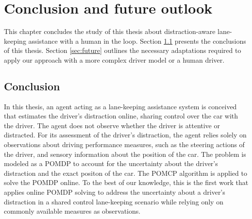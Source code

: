 \chapter{Conclusion and future outlook}
\label{ch:conclusion}

This chapter concludes the study of this thesis about distraction-aware lane-keeping assistance with a human in the loop. Section \ref{sec:conclusion} presents the conclusions of this thesis. Section \ref{sec:future} outlines the necessary adaptations required to apply our approach with a more complex driver model or a human driver.

\section{Conclusion}
\label{sec:conclusion}

In this thesis, an agent acting as a lane-keeping assistance system is conceived that estimates the driver's distraction online, sharing control over the car with the driver. The agent does not observe whether the driver is attentive or distracted. For its assessment of the driver's distraction, the agent relies solely on observations about driving performance measures, such as the steering actions of the driver, and sensory information about the position of the car. The problem is modeled as a POMDP to account for the uncertainty about the driver's distraction and the exact positon of the car. The POMCP algorithm \parencite{pomcp} is applied to solve the POMDP online. To the best of our knowledge, this is the first work that applies online POMDP solving to address the uncertainty about a driver's distraction in a shared control lane-keeping scenario while relying only on commonly available measures as observations.

